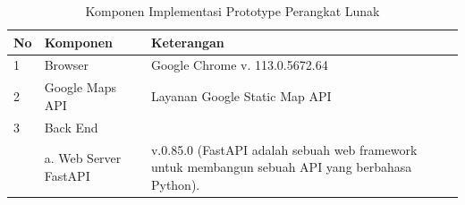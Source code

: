 \begin{singlespace}
	\begin{table}[H]
		\centering
		\caption{Komponen Implementasi Prototype Perangkat Lunak}
		\label{tbl:Komponen-Implementasi-Prototype}
		\begin{tabular}{|p{1cm}|p{4cm}|p{7cm}|}
			\hline
			\rowcolor[HTML]{D9D9D9} 
			No                 & Komponen                  & Keterangan                                                                                                                                                                                                                                                                                                                                        \\ \hline
			1                  & Browser                   & Google Chrome v. 113.0.5672.64                                                                                                                                                                                                                                                                                                                    \\ \hline
			2                  & Google Maps API           & Layanan Google Static Map API                                                                                                                                                                                                                                                                                                                     \\ \hline
			3                  & Back End                  &                                                                                                                                                                                                                                                                                                                                                   \\ \hline
			& a. Web Server FastAPI     & v.0.85.0 (FastAPI adalah sebuah web framework untuk membangun sebuah API yang berbahasa Python).                                                                                                                                                                                                                                                  \\ \cline{2-3} 

\end{tabular}
\end{table}
\end{singlespace}
